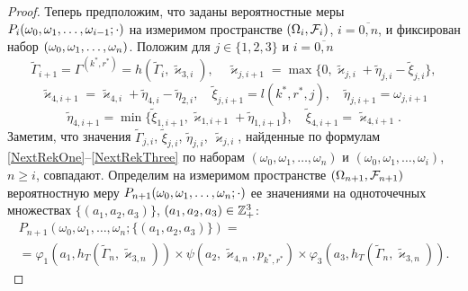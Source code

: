 \documentclass[a4paper,twoside]{article}
\theoremstyle{theorem}
\theoremstyle{remark}
\renewcommand*{\hm}[1]{#1\nobreak\discretionary{}%
	{\hbox{$\mathsurround=0pt #1$}}{}}%
\begin{document}
\begin{proof}
Теперь предположим, что заданы вероятностные меры $P_i(\omega_0\hm{}, \omega_1,\hm{} \ldots \hm{}, \omega_{i-1};\cdot)$ на измеримом пространстве $(\Omega_i, {\cal F}_i)$, $i=\overline{0,n}$,
и 
фиксирован набор $(\omega_0, \omega_1, \hm\ldots, \omega_{n})$. Положим для $j\in \{1, 2, 3\}$  и $i=\overline{0,n}$
\begin{equation}
\tilde{\Gamma}_{i+1}=\Gamma^{(k^*,r^*)}=h(\tilde{\Gamma}_{i},\tilde{\varkappa}_{3,i}), \quad \tilde{\varkappa}_{j,i+1}=\max\{ 0,\tilde{\varkappa}_{j,i}+\tilde{\eta}_{j,i} -\tilde{\xi}_{j,i}\},
\label{NextRekOne}
\end{equation}
\begin{equation}
\tilde{\varkappa}_{4,i+1}=\tilde{\varkappa}_{4,i}+\tilde{\eta}_{4,i}-\tilde{\eta}_{2,i}, \quad \tilde{\xi}_{j,i+1}=l(k^*,r^*,j),\quad \tilde{\eta}_{j,i+1}=\omega_{j,i+1}
\label{NextRekTwo}
\end{equation}
\begin{equation}
\tilde{\eta}_{4,i+1}=\min\{\tilde{\xi}_{1,i+1}, \tilde{\varkappa}_{1,i+1}+\tilde{\eta}_{1,i+1}\}, \quad \tilde{\xi}_{4,i+1}=\tilde{\varkappa}_{4,i+1}.
\label{NextRekThree}
\end{equation}
Заметим, что значения $\tilde{\Gamma}_{j,i}$, $\tilde\xi_{j,i}$, $\tilde\eta_{j,i}$, $\tilde\varkappa_{j,i}$, найденные по формулам \eqref{NextRekOne}--\eqref{NextRekThree} по наборам $(\omega_0, \omega_1,\ldots, \omega_n)$ и $(\omega_0, \omega_1,\ldots, \omega_i)$, $n\geqslant i$, совпадают.
Определим на измеримом пространстве $(\Omega_{n+1}, {\cal F}_{n+1})$ вероятностную меру  $P_{n+1}(\omega_0, \omega_1, \hm\ldots, \omega_n;\cdot)$
ее значениями на одноточечных множествах $\{(a_1,a_2,a_3)\}$, $(a_1,a_2,a_3)\hm\in {\mathbb Z}_+^3$:
\begin{multline}
P_{n+1}(\omega_0,\omega_1,\ldots,\omega_n;\{(a_1,a_2,a_3)\}) = \\
= \varphi_1(a_1,h_T(\tilde{\Gamma}_n,\tilde{\varkappa}_{3,n})) \times \psi(a_2,\tilde{\varkappa}_{4,n}, p_{k^*,r^*}) \times \varphi_3(a_3,h_T(\tilde{\Gamma}_n,\tilde{\varkappa}_{3,n})).
\label{probabilitiesTwo}
\end{multline}





\end{proof}
\end{document}
